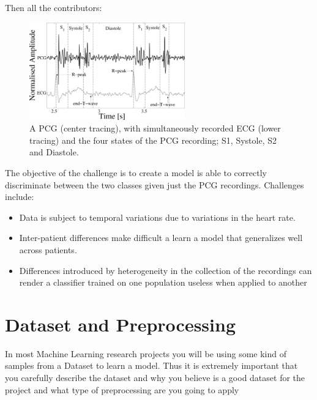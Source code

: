 \documentclass{project-logbook}
\begin{document}
Then all the contributors: {

\begin{figure}[h]
    \includegraphics[width=0.6\textwidth]{figures/PCG_ECG}
    \centering
    \caption{A PCG (center tracing), with simultaneously recorded ECG (lower tracing) and the four states of the PCG recording; S1, Systole, S2 and Diastole.}
    \label{fig:PCG_ECG}
\end{figure}

The objective of the challenge is to create a model is able to correctly discriminate between the two classes given just the PCG recordings. Challenges include:

\begin{itemize}
    \item Data is subject to temporal variations due to variations in the heart rate.
    \item Inter-patient differences make difficult a learn a model that generalizes well across patients.
    \item Differences introduced by heterogeneity in the collection of the recordings can render a classifier trained on one population useless when applied to another
\end{itemize}


\section{Dataset and Preprocessing} %
\label{sec:dataset_and_preprocessing}

\begin{tip}
In most Machine Learning research projects you will be using some kind of samples from a Dataset to learn a model. Thus it is extremely important that you carefully describe the dataset and why you believe is a good dataset for the project and what type of preprocessing are you going to apply
\end{tip}

}
\end{document}
